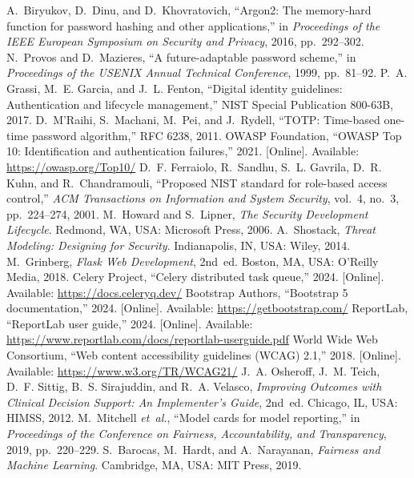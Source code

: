 \documentclass[conference]{IEEEtran}
\begin{document}
\begin{thebibliography}{00}
 A.~Biryukov, D.~Dinu, and D.~Khovratovich, ``Argon2: The memory-hard function for password hashing and other applications,'' in \emph{Proceedings of the IEEE European Symposium on Security and Privacy}, 2016, pp.~292--302.
 N.~Provos and D.~Mazieres, ``A future-adaptable password scheme,'' in \emph{Proceedings of the USENIX Annual Technical Conference}, 1999, pp.~81--92.
 P.~A. Grassi, M.~E. Garcia, and J.~L. Fenton, ``Digital identity guidelines: Authentication and lifecycle management,'' NIST Special Publication 800-63B, 2017.
 D.~M'Raihi, S.~Machani, M.~Pei, and J.~Rydell, ``TOTP: Time-based one-time password algorithm,'' RFC 6238, 2011.
 OWASP Foundation, ``OWASP Top 10: Identification and authentication failures,'' 2021. [Online]. Available: \url{https://owasp.org/Top10/}
 D.~F. Ferraiolo, R.~Sandhu, S.~L. Gavrila, D.~R. Kuhn, and R.~Chandramouli, ``Proposed NIST standard for role-based access control,'' \emph{ACM Transactions on Information and System Security}, vol.~4, no.~3, pp.~224--274, 2001.
 M.~Howard and S.~Lipner, \emph{The Security Development Lifecycle}. Redmond, WA, USA: Microsoft Press, 2006.
 A.~Shostack, \emph{Threat Modeling: Designing for Security}. Indianapolis, IN, USA: Wiley, 2014.
 M.~Grinberg, \emph{Flask Web Development}, 2nd~ed. Boston, MA, USA: O'Reilly Media, 2018.
 Celery Project, ``Celery distributed task queue,'' 2024. [Online]. Available: \url{https://docs.celeryq.dev/}
 Bootstrap Authors, ``Bootstrap 5 documentation,'' 2024. [Online]. Available: \url{https://getbootstrap.com/}
 ReportLab, ``ReportLab user guide,'' 2024. [Online]. Available: \url{https://www.reportlab.com/docs/reportlab-userguide.pdf}
 World Wide Web Consortium, ``Web content accessibility guidelines (WCAG) 2.1,'' 2018. [Online]. Available: \url{https://www.w3.org/TR/WCAG21/}
 J.~A. Osheroff, J.~M. Teich, D.~F. Sittig, B.~S. Sirajuddin, and R.~A. Velasco, \emph{Improving Outcomes with Clinical Decision Support: An Implementer's Guide}, 2nd~ed. Chicago, IL, USA: HIMSS, 2012.
 M.~Mitchell \emph{et~al.}, ``Model cards for model reporting,'' in \emph{Proceedings of the Conference on Fairness, Accountability, and Transparency}, 2019, pp.~220--229.
 S.~Barocas, M.~Hardt, and A.~Narayanan, \emph{Fairness and Machine Learning}. Cambridge, MA, USA: MIT Press, 2019.
\end{thebibliography}
\end{document}
